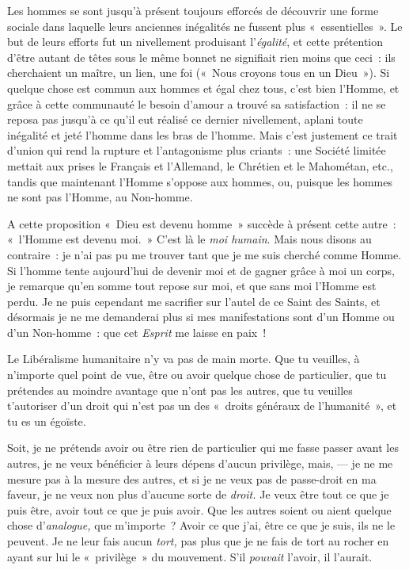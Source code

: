 \documentclass[french,twoside]{book} %
\begin{document}
Les hommes se sont jusqu’à présent toujours efforcés de découvrir une forme sociale dans laquelle leurs anciennes inégalités ne fussent plus « essentielles ». Le but de leurs efforts fut un nivellement produisant l’\emph{égalité}, et cette prétention d’être autant de têtes sous le même bonnet ne signifiait rien moins que ceci : ils cherchaient un maître, un lien, une foi (« Nous croyons tous en un Dieu »). Si quelque chose est commun aux hommes et égal chez tous, c’est bien l’Homme, et grâce à cette communauté le besoin d’amour a trouvé sa satisfaction : il ne se reposa pas jusqu’à ce qu’il eut réalisé ce dernier nivellement, aplani toute  inégalité et jeté l’homme dans les bras de l’homme. Mais c’est justement ce trait d’union qui rend la rupture et l’antagonisme plus criants : une Société limitée mettait aux prises le Français et l’Allemand, le Chrétien et le Mahométan, etc., tandis que maintenant l’Homme s’oppose aux hommes, ou, puisque les hommes ne sont pas l’Homme, au Non-homme.\par
A cette proposition « Dieu est devenu homme » succède à présent cette autre : « l’Homme est devenu moi. » C’est là le \emph{moi humain}. Mais nous disons au contraire : je n’ai pas pu me trouver tant que je me suis cherché comme Homme. Si l’homme tente aujourd’hui de devenir moi et de gagner grâce à moi un corps, je remarque qu’en somme tout repose sur moi, et que sans moi l’Homme est perdu. Je ne puis cependant me sacrifier sur l’autel de ce Saint des Saints, et désormais je ne me demanderai plus si mes manifestations sont d’un Homme ou d’un Non-homme : que cet \emph{Esprit} me laisse en paix !\par
Le Libéralisme humanitaire n’y va pas de main morte. Que tu veuilles, à n’importe quel point de vue, être ou avoir quelque chose de particulier, que tu prétendes au moindre avantage que n’ont pas les autres, que tu veuilles t’autoriser d’un droit qui n’est pas un des « droits généraux de l’humanité », et tu es un égoïste.\par
Soit, je ne prétends avoir ou être rien de particulier qui me fasse passer avant les autres, je ne veux bénéficier à leurs dépens d’aucun privilège, mais, — je ne me mesure pas à la mesure des autres, et si je ne veux pas de passe-droit en ma faveur, je ne veux non plus d’aucune sorte de \emph{droit.} Je veux être tout ce que je puis être, avoir tout ce que je puis avoir. Que les autres soient ou aient quelque chose d’\emph{analogue,} que m’importe ? Avoir ce que j’ai, être ce que je suis, ils ne le peuvent. Je ne leur fais aucun \emph{tort,} pas plus que je ne fais de tort au rocher en ayant sur lui le « privilège » du mouvement. S’il \emph{pouvait} l’avoir, il l’aurait.\par
\end{document}
